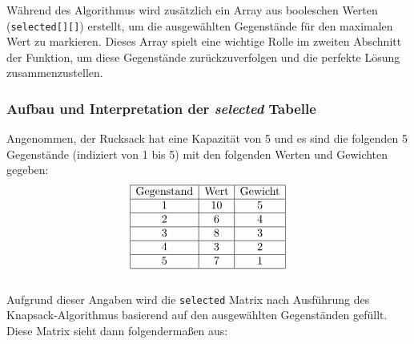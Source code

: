 Während des Algorithmus wird zusätzlich ein Array aus booleschen Werten (\texttt{selected[][]}) erstellt, um die
ausgewählten Gegenstände für den maximalen Wert zu markieren. Dieses Array spielt eine wichtige Rolle im zweiten Abschnitt
der Funktion, um diese Gegenstände zurückzuverfolgen und die perfekte Lösung zusammenzustellen.

\subsubsection*{Aufbau und Interpretation der \textit{selected} Tabelle}
Angenommen, der Rucksack hat eine Kapazität von 5 und es sind die folgenden 5 Gegenstände (indiziert von 1 bis 5) mit den folgenden Werten und Gewichten gegeben:
\[
\begin{array}{|c|c|c|}
\hline
\text{Gegenstand} & \text{Wert} & \text{Gewicht} \\
\hline
1 & 10 & 5 \\
\hline
2 & 6 & 4 \\
\hline
3 & 8 & 3 \\
\hline
4 & 3 & 2 \\
\hline
5 & 7 & 1 \\
\hline
\end{array}
\]
\\
Aufgrund dieser Angaben wird die \texttt{selected} Matrix nach Ausführung des Knapsack-Algorithmus basierend auf den
ausgewählten Gegenständen gefüllt. Diese Matrix sieht dann folgendermaßen aus:

